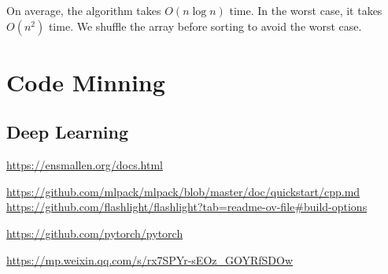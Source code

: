 On average, the algorithm takes $O\left(n\log n\right)$ time. In the worst case, it takes $O\left(n^2\right)$ time.
We shuffle the array before sorting to avoid the worst case.

\section{Code Minning}

\subsection{Deep Learning}

\url{https://ensmallen.org/docs.html}

\url{https://github.com/mlpack/mlpack/blob/master/doc/quickstart/cpp.md}
\url{https://github.com/flashlight/flashlight?tab=readme-ov-file#build-options}

\url{https://github.com/pytorch/pytorch}

\url{https://mp.weixin.qq.com/s/rx7SPYr-sEOz_GOYRfSDOw}
